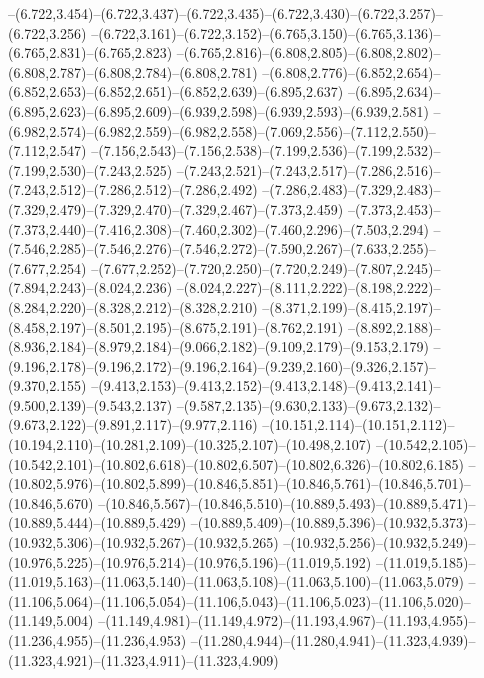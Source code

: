   --(6.722,3.454)--(6.722,3.437)--(6.722,3.435)--(6.722,3.430)--(6.722,3.257)--(6.722,3.256)%
  --(6.722,3.161)--(6.722,3.152)--(6.765,3.150)--(6.765,3.136)--(6.765,2.831)--(6.765,2.823)%
  --(6.765,2.816)--(6.808,2.805)--(6.808,2.802)--(6.808,2.787)--(6.808,2.784)--(6.808,2.781)%
  --(6.808,2.776)--(6.852,2.654)--(6.852,2.653)--(6.852,2.651)--(6.852,2.639)--(6.895,2.637)%
  --(6.895,2.634)--(6.895,2.623)--(6.895,2.609)--(6.939,2.598)--(6.939,2.593)--(6.939,2.581)%
  --(6.982,2.574)--(6.982,2.559)--(6.982,2.558)--(7.069,2.556)--(7.112,2.550)--(7.112,2.547)%
  --(7.156,2.543)--(7.156,2.538)--(7.199,2.536)--(7.199,2.532)--(7.199,2.530)--(7.243,2.525)%
  --(7.243,2.521)--(7.243,2.517)--(7.286,2.516)--(7.243,2.512)--(7.286,2.512)--(7.286,2.492)%
  --(7.286,2.483)--(7.329,2.483)--(7.329,2.479)--(7.329,2.470)--(7.329,2.467)--(7.373,2.459)%
  --(7.373,2.453)--(7.373,2.440)--(7.416,2.308)--(7.460,2.302)--(7.460,2.296)--(7.503,2.294)%
  --(7.546,2.285)--(7.546,2.276)--(7.546,2.272)--(7.590,2.267)--(7.633,2.255)--(7.677,2.254)%
  --(7.677,2.252)--(7.720,2.250)--(7.720,2.249)--(7.807,2.245)--(7.894,2.243)--(8.024,2.236)%
  --(8.024,2.227)--(8.111,2.222)--(8.198,2.222)--(8.284,2.220)--(8.328,2.212)--(8.328,2.210)%
  --(8.371,2.199)--(8.415,2.197)--(8.458,2.197)--(8.501,2.195)--(8.675,2.191)--(8.762,2.191)%
  --(8.892,2.188)--(8.936,2.184)--(8.979,2.184)--(9.066,2.182)--(9.109,2.179)--(9.153,2.179)%
  --(9.196,2.178)--(9.196,2.172)--(9.196,2.164)--(9.239,2.160)--(9.326,2.157)--(9.370,2.155)%
  --(9.413,2.153)--(9.413,2.152)--(9.413,2.148)--(9.413,2.141)--(9.500,2.139)--(9.543,2.137)%
  --(9.587,2.135)--(9.630,2.133)--(9.673,2.132)--(9.673,2.122)--(9.891,2.117)--(9.977,2.116)%
  --(10.151,2.114)--(10.151,2.112)--(10.194,2.110)--(10.281,2.109)--(10.325,2.107)--(10.498,2.107)%
  --(10.542,2.105)--(10.542,2.101)--(10.802,6.618)--(10.802,6.507)--(10.802,6.326)--(10.802,6.185)%
  --(10.802,5.976)--(10.802,5.899)--(10.846,5.851)--(10.846,5.761)--(10.846,5.701)--(10.846,5.670)%
  --(10.846,5.567)--(10.846,5.510)--(10.889,5.493)--(10.889,5.471)--(10.889,5.444)--(10.889,5.429)%
  --(10.889,5.409)--(10.889,5.396)--(10.932,5.373)--(10.932,5.306)--(10.932,5.267)--(10.932,5.265)%
  --(10.932,5.256)--(10.932,5.249)--(10.976,5.225)--(10.976,5.214)--(10.976,5.196)--(11.019,5.192)%
  --(11.019,5.185)--(11.019,5.163)--(11.063,5.140)--(11.063,5.108)--(11.063,5.100)--(11.063,5.079)%
  --(11.106,5.064)--(11.106,5.054)--(11.106,5.043)--(11.106,5.023)--(11.106,5.020)--(11.149,5.004)%
  --(11.149,4.981)--(11.149,4.972)--(11.193,4.967)--(11.193,4.955)--(11.236,4.955)--(11.236,4.953)%
  --(11.280,4.944)--(11.280,4.941)--(11.323,4.939)--(11.323,4.921)--(11.323,4.911)--(11.323,4.909)%
